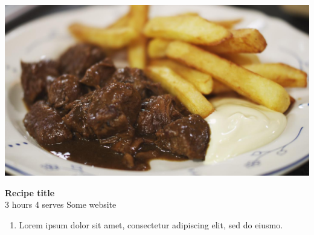 \documentclass{article}
\newcommand{\recipesection}[1]{
    \LARGE\textcolor{darkcol}{\textbf{#1}}
}
\newcommand{\preparationitem}[1]{
    \normalsize\item{#1}
}
\newcommand{\recipetext}[1]{
    \textcolor{darkcol}{#1}
}
\begin{document}
\setlength{\columnsep}{2.2em}
\setlength{\columnseprule}{4pt}
\begin{paracol}{2}
\begin{leftcolumn}

\begin{center}
\includegraphics[width=\linewidth]{frietstoofvlees.jpg}%
\end{center}
\recipesection{Recipe title} %
\vspace{0pt}
\\
\textcolor{darkcol}{\normalsize\faClockO\recipetext
{3 hours} %
}
\textcolor{darkcol}{\normalsize\faUser\recipetext
{4 serves} %
}
\textcolor{darkcol}{
\normalsize\faNewspaperO\recipetext{Some website} %
}
\vspace{5pt}
\begin{enumerate}[wide, labelwidth=!, labelindent=0pt]
        \preparationitem{Lorem ipsum dolor sit amet, consectetur adipiscing elit, sed do eiusmo.} %
        

\end{enumerate}
\end{leftcolumn}
\end{paracol}
\end{document}
